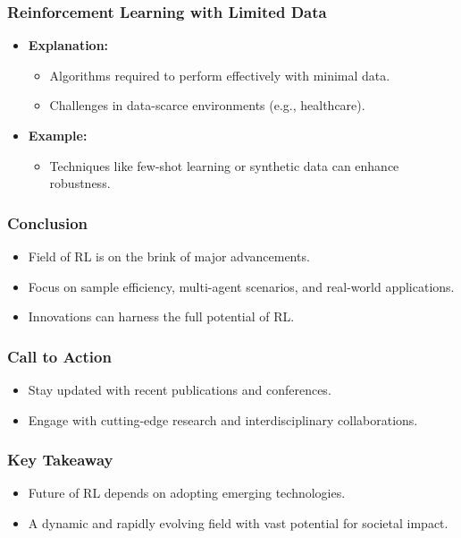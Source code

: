 \documentclass[aspectratio=169]{beamer}
\begin{document}
\begin{frame}[fragile]
    \frametitle{Reinforcement Learning with Limited Data}
    \begin{itemize}
        \item \textbf{Explanation:} 
        \begin{itemize}
            \item Algorithms required to perform effectively with minimal data.
            \item Challenges in data-scarce environments (e.g., healthcare).
        \end{itemize}
        \item \textbf{Example:}
        \begin{itemize}
            \item Techniques like few-shot learning or synthetic data can enhance robustness.
        \end{itemize}
    \end{itemize}
\end{frame}

\begin{frame}[fragile]
    \frametitle{Conclusion}
    \begin{itemize}
        \item Field of RL is on the brink of major advancements.
        \item Focus on sample efficiency, multi-agent scenarios, and real-world applications.
        \item Innovations can harness the full potential of RL.
    \end{itemize}
\end{frame}

\begin{frame}[fragile]
    \frametitle{Call to Action}
    \begin{itemize}
        \item Stay updated with recent publications and conferences.
        \item Engage with cutting-edge research and interdisciplinary collaborations.
    \end{itemize}
\end{frame}

\begin{frame}[fragile]
    \frametitle{Key Takeaway}
    \begin{itemize}
        \item Future of RL depends on adopting emerging technologies.
        \item A dynamic and rapidly evolving field with vast potential for societal impact.
    \end{itemize}
\end{frame}
\end{document}
